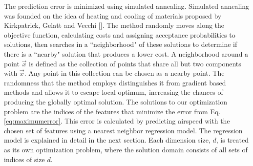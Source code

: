 \documentclass[]{aiaa-tc}
\begin{document}
The prediction error is minimized using simulated annealing. Simulated annealing was founded on the idea of heating and cooling of materials proposed by Kirkpatrick, Gelatt and Vecchi []. The method randomly moves along the objective function, calculating costs and assigning acceptance probabilities to solutions, then searches in a ``neighborhood" of these solutions to determine if there is a ``nearby" solution that produces a lower cost. A neighborhood around a point $\vec{x}$ is defined as the collection of points that share all but two components with $\vec{x}$. Any point in this collection can be chosen as a nearby point. The randomness that the method employs distinguishes it from gradient based methods and allows it to escape local optimum, increasing the chances of producing the globally optimal solution. The solutions to our optimization problem are the indices of the features that minimize the error from Eq. \ref{eq:maximumerror}. This error is calculated by predicting airspeed with the chosen set of features using a nearest neighbor regression model. The regression model is explained in detail in the next section. Each dimension size, $d$, is treated as its own optimization problem, where the solution domain consists of all sets of indices of size $d$. 

 
\end{document}
